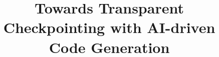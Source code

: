 \documentclass[conference]{IEEEtran}
\begin{document}


\title{Towards Transparent Checkpointing with AI-driven Code Generation}

\maketitle
\end{document}
